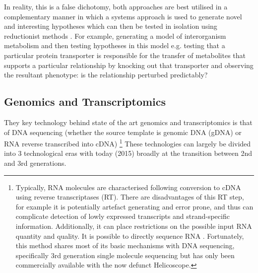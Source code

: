In reality, this is a false dichotomy, both approaches are best utilised in
a complementary manner in which a systems approach is used to generate novel and interesting
hypotheses which can then be tested in isolation using reductionist methods \citep{Casadevall2008}.  
For example, generating a model of interorganism metabolism and then testing
hypotheses in this model e.g. testing that a particular protein transporter is responsible
for the transfer of metabolites that supports a particular relationship by knocking out
that transporter and observing the resultant phenotype: is the relationship perturbed predictably?





\subsection{Genomics and Transcriptomics}

They key technology behind state of the art genomics and transcriptomics is that of
DNA sequencing (whether the source template is genomic DNA (gDNA) or RNA reverse transcribed into cDNA)
\footnote{Typically, RNA molecules are characterised following
    conversion to cDNA using reverse transcriptases (RT).  There are disadvantages of this RT step, for example 
it is potentially artefact generating and error prone, and thus can complicate detection of lowly expressed
transcripts and strand-specific information. Additionally, it can place restrictions on the possible
input RNA quantity and quality. It is possible to directly sequence RNA \citep{Ozsolak2009}.
Fortunately, this method shares most of its basic mechanisms with DNA sequencing, specifically 3rd generation single molecule 
sequencing \citep{Ozsolak2011} but has only been commercially available with the now defunct Helicoscope.}
These technologies can largely be divided into 3 technological eras with today (2015) 
broadly at the transition between 2nd and 3rd generations.

